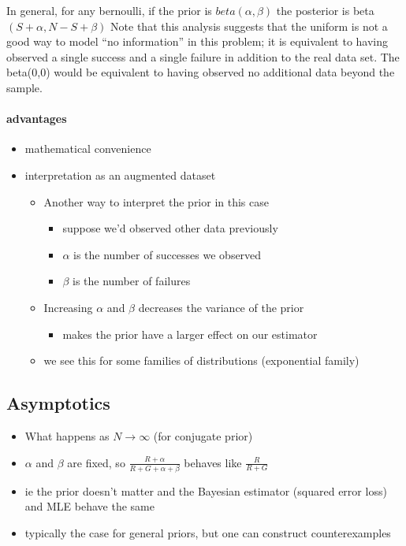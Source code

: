 \begin{itemize}[leftmargin=0pt]
  In general, for any bernoulli, if the prior is $beta(\alpha,\beta)$ the
  posterior is beta$(S + \alpha, N - S + \beta)$ Note that this analysis
  suggests that the uniform is not a good way to model ``no
  information'' in this problem; it is equivalent to having observed a
  single success and a single failure in addition to the real data
  set.  The beta(0,0) would be equivalent to having observed no
  additional data beyond the sample.
\end{itemize}

\paragraph{advantages}
\begin{itemize}
\item mathematical convenience
\item interpretation as an augmented dataset
\begin{itemize}
\item Another way to interpret the prior in this case
\begin{itemize}
\item suppose we'd observed other data previously
\item $\alpha$ is the number of successes we observed
\item $\beta$ is the number of failures
\end{itemize}
\item Increasing $\alpha$ and $\beta$ decreases the variance of the prior
\begin{itemize}
\item makes the prior have a larger effect on our estimator
\end{itemize}
\item we see this for some families of distributions (exponential family)
\end{itemize}
\end{itemize}

\subsection{Asymptotics}

\begin{itemize}[leftmargin=0pt]
\item What happens as $N \to \infty$ (for conjugate prior)
\item $\alpha$ and $\beta$ are fixed, so $\frac{R + \alpha}{R + G + \alpha + \beta}$ behaves
  like $\frac{R}{R+G}$
\item ie the prior doesn't matter and the Bayesian estimator
       (squared error loss) and MLE behave the same
\item typically the case for general priors, but one can construct
       counterexamples
\end{itemize}


